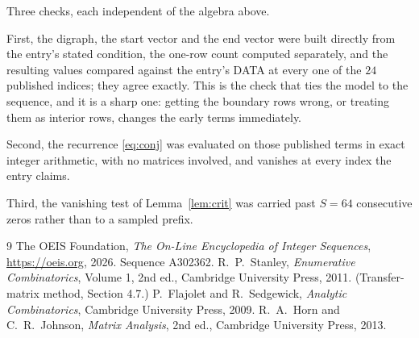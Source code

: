 \documentclass[11pt,a4paper]{article}
\theoremstyle{plain}
\theoremstyle{definition}
\begin{document}
Three checks, each independent of the algebra above.

First, the digraph, the start vector and the end vector were built directly from the
entry's stated condition, the one-row count computed separately, and the resulting values
compared against the entry's DATA at every one of the $24$ published indices; they
agree exactly. This is the check that ties the model to the sequence, and it is a sharp one:
getting the boundary rows wrong, or treating them as interior rows, changes the early terms
immediately.

Second, the recurrence \eqref{eq:conj} was evaluated on those published terms in exact
integer arithmetic, with no matrices involved, and vanishes at every index the entry claims.

Third, the vanishing test of Lemma~\ref{lem:crit} was carried past $S=64$ consecutive
zeros rather than to a sampled prefix.

\begin{thebibliography}{9}
 The OEIS Foundation, \emph{The On-Line Encyclopedia of Integer
Sequences}, \url{https://oeis.org}, 2026. Sequence A302362.
 R.~P.~Stanley, \emph{Enumerative Combinatorics}, Volume 1, 2nd ed.,
Cambridge University Press, 2011. (Transfer-matrix method, Section 4.7.)
 P.~Flajolet and R.~Sedgewick, \emph{Analytic Combinatorics}, Cambridge
University Press, 2009.
 R.~A.~Horn and C.~R.~Johnson, \emph{Matrix Analysis}, 2nd ed., Cambridge
University Press, 2013.
\end{thebibliography}
\end{document}
